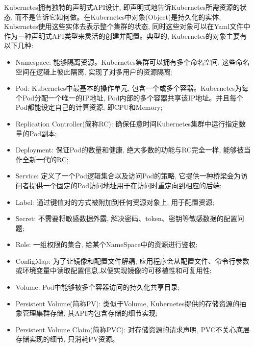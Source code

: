 Kubernetes拥有独特的声明式API设计, 即声明式地告诉Kubernetes所需资源的状态, 而不是告诉它如何做。在Kubernetes中对象(Object)是持久化的实体, Kubernetes使用这些实体去表示整个集群的状态, 同时这些对象可以在Yaml\cite{ben2009yaml}文件中作为一种声明式API类型来灵活的创建并配置。典型的, Kubernetes的对象主要有以下几种: 

\begin{itemize}[itemindent=2em]
    \item Namespace: 能够隔离资源。Kubernetes集群可以拥有多个命名空间, 这些命名空间在逻辑上彼此隔离, 实现了对多用户的资源隔离;

    \item Pod: Kubernetes中最基本的操作单元, 包含一个或多个容器。Kubernetes为每个Pod分配一个唯一的IP地址, Pod内部的多个容器共享该IP地址。并且每个Pod都能设定自己的计算资源, 即CPU和Memory;

    \item Replication Controller(简称RC): 确保任意时间Kubernetes集群中运行指定数量的Pod副本;

    \item Deployment: 保证Pod的数量和健康, 绝大多数的功能与RC完全一样, 能够被当作全新一代的RC;

    \item Service: 定义了一个Pod逻辑集合以及访问Pod的策略, 它提供一种桥梁会为访问者提供一个固定的Pod访问地址用于在访问时重定向到相应的后端;

    \item Label: 通过键值对的方式被附加到任何资源对象上, 用于配置资源;

    \item Secret: 不需要将敏感数据外露, 解决密码、token、密钥等敏感数据的配置问题;

    \item Role: 一组权限的集合, 给某个NameSpace中的资源进行鉴权;

    \item ConfigMap: 为了让镜像和配置文件解耦, 应用程序会从配置文件、命令行参数或环境变量中读取配置信息,以便实现镜像的可移植性和可复用性;

    \item Volume: Pod中能够被多个容器访问的持久化共享目录;

    \item Persistent Volume(简称PV): 类似于Volume, Kubernetes提供的存储资源的抽象管理集群存储, 其API内包含存储的细节实现;

    \item Persistent Volume Claim(简称PVC): 对存储资源的请求声明, PVC不关心底层存储实现的细节, 只消耗PV资源。

\end{itemize}


